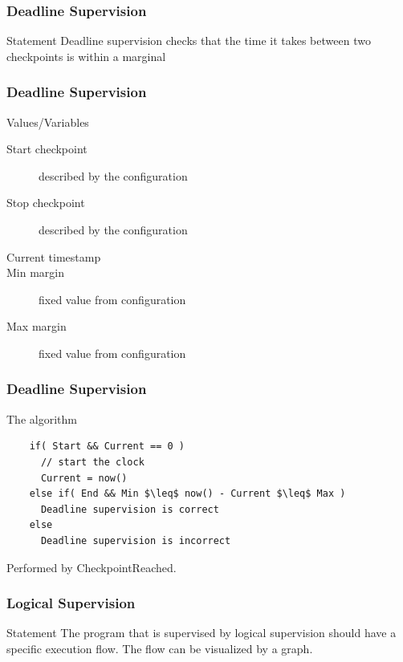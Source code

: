 \documentclass{beamer}
\begin{document}
\begin{frame}
  \frametitle{Deadline Supervision}
  \begin{block}{Statement}
    Deadline supervision checks that the time it takes between two
    checkpoints is within a marginal
  \end{block}
\end{frame}

\begin{frame}
  \frametitle{Deadline Supervision}
  \begin{block}{Values/Variables}
    \begin{description}
      \item[Start checkpoint] described by the configuration
      \item[Stop checkpoint] described by the configuration
      \item[Current timestamp]
      \item[Min margin] fixed value from configuration
      \item[Max margin] fixed value from configuration
    \end{description}
  \end{block}
\end{frame}

\begin{frame}[fragile]
  \frametitle{Deadline Supervision}
  \begin{block}{The algorithm}
    \begin{lstlisting}
    if( Start && Current == 0 )
      // start the clock
      Current = now()
    else if( End && Min $\leq$ now() - Current $\leq$ Max )
      Deadline supervision is correct
    else
      Deadline supervision is incorrect
    \end{lstlisting}
  \end{block}
  Performed by CheckpointReached.
\end{frame}

\begin{frame}
  \frametitle{Logical Supervision}
  \begin{block}{Statement}
    The program that is supervised by logical supervision should have
    a specific execution flow. The flow can be visualized by a
    graph.
  \end{block}
\end{frame}
\end{document}

